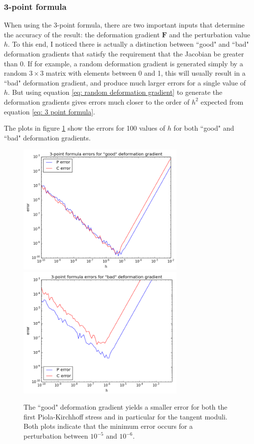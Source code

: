 \documentclass[]{spie}  %
\begin{document}
\subsubsection{3-point formula}
When using the 3-point formula, there are two important inputs that determine the accuracy of the result: the deformation gradient $\bm{F}$ and the perturbation value $h$. To this end, I noticed there is actually a distinction between ``good" and ``bad" deformation gradients that satisfy the requirement that the Jacobian be greater than 0. If for example, a random deformation gradient is generated simply by a random $3 \times 3$ matrix with elements between 0 and 1, this will usually result in a ``bad" deformation gradient, and produce much larger errors for a single value of $h$. But using equation \ref{eq: random deformation gradient} to generate the deformation gradients gives errors much closer to the order of $h^2$ expected from equation \ref{eq: 3 point formula}. 

The plots in figure \ref{fig: numerical differentiation error} show the errors for 100 values of $h$ for both ``good" and ``bad" deformation gradients. 

\begin{figure}[h]
\centering
\includegraphics[width=3.25in]{error_good_F.png} \quad
\includegraphics[width=3.25in]{error_bad_F.png} 
\caption{The ``good" deformation gradient yields a smaller error for both the first Piola-Kirchhoff stress and in particular for the tangent moduli. Both plots indicate that the minimum error occurs for a perturbation between $10^{-5}$ and $10^{-6}$.} 
\label{fig: numerical differentiation error}
\end{figure}
\end{document}
